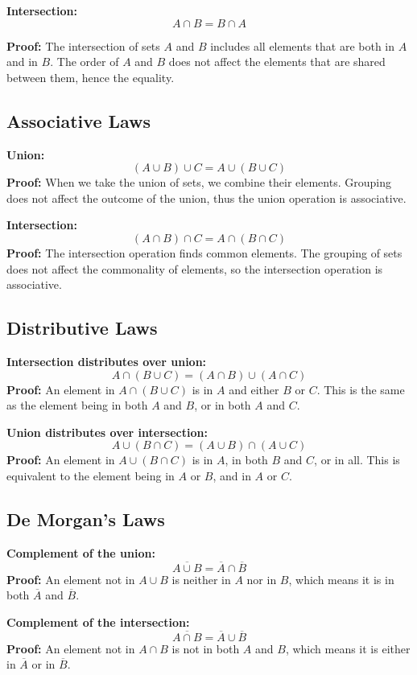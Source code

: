 \noindent\textbf{Intersection:}
$$A \cap B = B \cap A$$


\textbf{Proof:} 
The intersection of sets \( A \) and \( B \) includes all elements that are both in \( A \) and in \( B \). The order of \( A \) and \( B \) does not affect the elements that are shared between them, hence the equality.

\subsection*{Associative Laws}
\textbf{Union:}
\[
(A \cup B) \cup C = A \cup (B \cup C)
\]
\textbf{Proof:} 
When we take the union of sets, we combine their elements. Grouping does not affect the outcome of the union, thus the union operation is associative.

\textbf{Intersection:}
\[
(A \cap B) \cap C = A \cap (B \cap C)
\]
\textbf{Proof:} 
The intersection operation finds common elements. The grouping of sets does not affect the commonality of elements, so the intersection operation is associative.

\subsection*{Distributive Laws}
\textbf{Intersection distributes over union:}
\[
A \cap (B \cup C) = (A \cap B) \cup (A \cap C)
\]
\textbf{Proof:} 
An element in \( A \cap (B \cup C) \) is in \( A \) and either \( B \) or \( C \). This is the same as the element being in both \( A \) and \( B \), or in both \( A \) and \( C \).

\textbf{Union distributes over intersection:}
\[
A \cup (B \cap C) = (A \cup B) \cap (A \cup C)
\]
\textbf{Proof:} 
An element in \( A \cup (B \cap C) \) is in \( A \), in both \( B \) and \( C \), or in all. This is equivalent to the element being in \( A \) or \( B \), and in \( A \) or \( C \).

\subsection*{De Morgan's Laws}
\textbf{Complement of the union:}
\[
\overline{A \cup B} = \overline{A} \cap \overline{B}
\]
\textbf{Proof:} 
An element not in \( A \cup B \) is neither in \( A \) nor in \( B \), which means it is in both \( \overline{A} \) and \( \overline{B} \).

\textbf{Complement of the intersection:}
\[
\overline{A \cap B} = \overline{A} \cup \overline{B}
\]
\textbf{Proof:} 
An element not in \( A \cap B \) is not in both \( A \) and \( B \), which means it is either in \( \overline{A} \) or in \( \overline{B} \).

